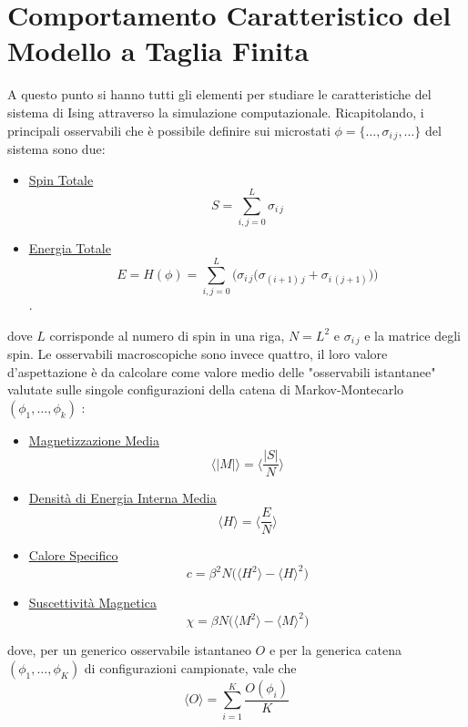 \section{Comportamento Caratteristico del Modello a Taglia Finita}\label{Parte A}
A questo punto si hanno tutti gli elementi per studiare le caratteristiche del sistema di Ising attraverso la simulazione computazionale.
Ricapitolando, i principali osservabili che è possibile definire sui microstati $\phi=\lbrace \ldots, \sigma_{i\, j} ,\ldots\rbrace$ del sistema sono due:
\begin{itemize}
\item \underline{Spin Totale} $$S= \sum_{i,j=0}^{L}\sigma_{i\, j}$$
\item \underline{Energia Totale} $$ E = H(\phi) = \sum_{i,j=0}^{L}\biggr(\sigma_{i\, j}\big(\sigma_{(i+1)\, j} + \sigma_{i\, (j+1)}\big)\biggr)$$.
\end{itemize}
dove $L$ corrisponde al numero di spin in una riga, $N=L^2$ e $\sigma_{i\, j}$ e la matrice degli spin.
\newline
Le osservabili macroscopiche sono invece quattro, il loro valore d'aspettazione è da calcolare come valore medio delle "osservabili istantanee" valutate sulle singole configurazioni della catena di Markov-Montecarlo $(\phi_1,\ldots,\phi_k)$ :
\begin{itemize}
\item \underline{Magnetizzazione Media} $$\langle|M|\rangle= \langle\dfrac{|S|}{N}\rangle$$
\item \underline{Densità di Energia Interna Media} $$\langle H \rangle = \langle \dfrac{E}{N} \rangle $$
\item \underline{Calore Specifico} $$c = \beta^2 N \biggr( \langle H^2 \rangle - \langle H\rangle ^2 \biggr)$$
\item \underline{Suscettività Magnetica} $$\chi = \beta N \biggr( \langle M^2 \rangle - \langle M \rangle^2\biggr)$$
\end{itemize}
dove, per un generico osservabile istantaneo $O$ e per la generica catena $ (\phi_1, \ldots, \phi_K)$ di configurazioni campionate, vale che
\begin{displaymath}
	\langle O \rangle = \sum_{i=1}^K \dfrac{O(\phi_i)}{K}
\end{displaymath}

